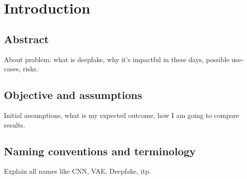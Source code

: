 \chapter{Introduction}
\section{Abstract}
About problem: what is deepfake, why it's impactful in these days, possible use-cases, risks.

\section{Objective and assumptions}
Initial assumptions, what is my expected outcome, how I am going to compare results.

\section{Naming conventions and terminology}
Explain all names like CNN, VAE, Deepfake, itp.